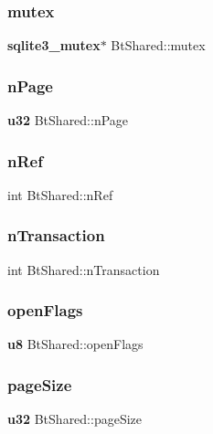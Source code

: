 \subsubsection{mutex}
{\footnotesize\ttfamily \textbf{ sqlite3\+\_\+mutex}$\ast$ Bt\+Shared\+::mutex}

\mbox{\label{struct_bt_shared_a8679241243f9043ede97b5c57d20c3ea}} 
\subsubsection{nPage}
{\footnotesize\ttfamily \textbf{ u32} Bt\+Shared\+::n\+Page}

\mbox{\label{struct_bt_shared_a43d0226fa08d7fae5f992f3a2d72cc08}} 
\subsubsection{nRef}
{\footnotesize\ttfamily int Bt\+Shared\+::n\+Ref}

\mbox{\label{struct_bt_shared_a6101a0e79a95e884ac4dc9c70a947715}} 
\subsubsection{nTransaction}
{\footnotesize\ttfamily int Bt\+Shared\+::n\+Transaction}

\mbox{\label{struct_bt_shared_a8fbc250e23d7c417ccfec8cceb08329d}} 
\subsubsection{openFlags}
{\footnotesize\ttfamily \textbf{ u8} Bt\+Shared\+::open\+Flags}

\mbox{\label{struct_bt_shared_a9e42a71e5e3f98ec1e5b30998b27aae0}} 
\subsubsection{pageSize}
{\footnotesize\ttfamily \textbf{ u32} Bt\+Shared\+::page\+Size}

\mbox{\label{struct_bt_shared_a8f8b52dee390e5606e8e2a8511530de7}} 

